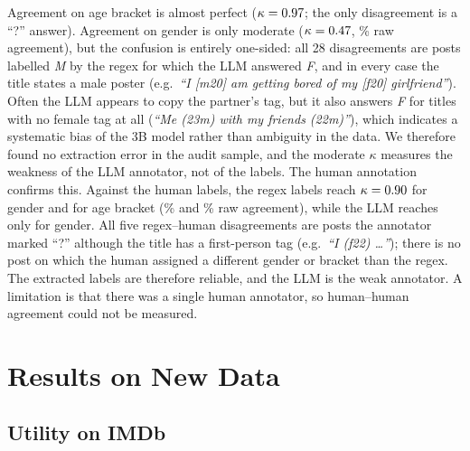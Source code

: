 \documentclass[11pt]{article}
\begin{document}
Agreement on age bracket is almost perfect ($\kappa=0.97$; the only disagreement is a ``?'' answer). Agreement on gender is only moderate ($\kappa=0.47$, \RawRegLLMG\% raw agreement), but the confusion is entirely one-sided: all 28 disagreements are posts labelled \emph{M} by the regex for which the LLM answered \emph{F}, and in every case the title states a male poster (e.g.\ \emph{``I [m20] am getting bored of my [f20] girlfriend''}). Often the LLM appears to copy the partner's tag, but it also answers \emph{F} for titles with no female tag at all (\emph{``Me (23m) with my friends (22m)''}), which indicates a systematic bias of the 3B model rather than ambiguity in the data. We therefore found no extraction error in the audit sample, and the moderate $\kappa$ measures the weakness of the LLM annotator, not of the labels. The human annotation confirms this. Against the human labels, the regex labels reach $\kappa=0.90$ for gender and \KappaRegHumA{} for age bracket (\RawRegHumG\% and \RawRegHumA\% raw agreement), while the LLM reaches only \KappaLLMHumG{} for gender. All five regex--human disagreements are posts the annotator marked ``?'' although the title has a first-person tag (e.g.\ \emph{``I (f22) \ldots''}); there is no post on which the human assigned a different gender or bracket than the regex. The extracted labels are therefore reliable, and the LLM is the weak annotator. A limitation is that there was a single human annotator, so human--human agreement could not be measured.

\begin{table}[t]
\centering
\small
\resizebox{\columnwidth}{!}{}
\caption{Label agreement on the 100-post audit sample. ``Regex'': labels mined from titles; ``human'': independent annotation by the author. ``?'' answers count as disagreement.}
\label{tab:agreement}
\end{table}

\section{Results on New Data}
\label{sec:results}

\subsection{Utility on IMDb}
\begin{table}[t]
\centering
\small
\setlength{\tabcolsep}{3.5pt}

\caption{Utility on SST-2 (replication) and IMDb (new) by budget $\varepsilon$; IMDb reviews truncated to $\le$60 words. Acc is the static sentiment proxy.}
\label{tab:imdb}
\end{table}
\end{document}
